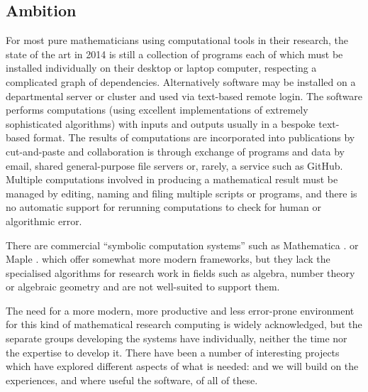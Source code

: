 \subsection{Ambition}





For most pure mathematicians using computational tools in their
research, the state of the art in 2014 is still a collection of
programs each of which must be installed individually on their
desktop or laptop computer, respecting a complicated graph of
dependencies. Alternatively software may be installed on a
departmental server or cluster and used via text-based remote
login. The software performs computations (using excellent
implementations of extremely sophisticated algorithms) with inputs and
outputs usually in a bespoke text-based format. The results of
computations are incorporated into publications by cut-and-paste and
collaboration is through exchange of programs and data by email,
shared general-purpose file servers or, rarely, a service such as
GitHub. Multiple computations involved in producing a mathematical
result must be managed by editing, naming and filing multiple scripts
or programs, and there is no automatic support for rerunning
computations to check for human or algorithmic error. 


There are commercial ``symbolic computation systems'' such as
Mathematica \textsuperscript{\textregistered}. or Maple \textsuperscript{\textregistered}. which offer somewhat more modern frameworks, but
they lack the specialised algorithms for research work in fields such
as algebra, number theory or algebraic geometry and are not
well-suited to support them.

The need for a more modern, more productive and less error-prone
environment for this kind of mathematical research computing is widely
acknowledged, but the separate groups developing the systems have
individually, neither the time nor the expertise to develop it. There
have been a number of interesting projects which have explored
different aspects of what is needed:  and we will build on the experiences, and where
useful the software, of all of these.


